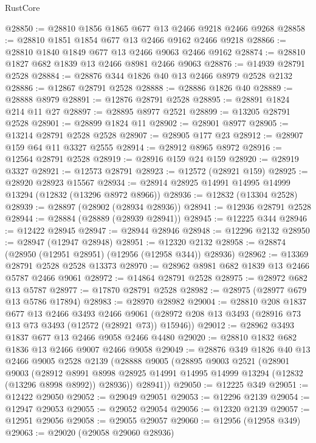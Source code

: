 \begin{lexlean}{RustCore}
\begin{coremodule}
@28850 := @28810 @1856 @1865 @677 @13 @2466 @9218 @2466 @9268
@28858 := @28810 @1851 @1854 @677 @13 @2466 @9162 @2466 @9218
@28866 := @28810 @1840 @1849 @677 @13 @2466 @9063 @2466 @9162
@28874 := @28810 @1827 @682 @1839 @13 @2466 @8981 @2466 @9063
@28876 := @14939 @28791 @2528
@28884 := @28876 @344 @1826 @40 @13 @2466 @8979 @2528 @2132
@28886 := @12867 @28791 @2528
@28888 := @28886 @1826 @40
@28889 := @28888 @8979
@28891 := @12876 @28791 @2528
@28895 := @28891 @1824 @214 @11 @27
@28897 := @28895 @8977 @2521
@28899 := @13205 @28791 @2528
@28901 := @28899 @1824 @11
@28902 := @28901 @8977
@28905 := @13214 @28791 @2528 @2528
@28907 := @28905 @177 @23
@28912 := @28907 @159 @64 @11 @3327 @2555
@28914 := @28912 @8965 @8972
@28916 := @12564 @28791 @2528
@28919 := @28916 @159 @24 @159
@28920 := @28919 @3327
@28921 := @12573 @28791
@28923 := @12572 (@28921 @159)
@28925 := @28920 @28923 @15567
@28934 := @28914 @28925 @14991 @14995 @14999 @13294 (@12832 (@13296 @8972 @8966))
@28936 := @12832 (@13304 @2528)
@28939 := @28897 (@28902 (@28934 @28936))
@28941 := @12936 @28791 @2528
@28944 := @28884 (@28889 (@28939 @28941))
@28945 := @12225 @344
@28946 := @12422 @28945
@28947 := @28944 @28946
@28948 := @12296 @2132
@28950 := @28947 (@12947 @28948)
@28951 := @12320 @2132
@28958 := @28874 (@28950 (@12951 @28951) (@12956 (@12958 @344)) @28936)
@28962 := @13369 @28791 @2528 @2528 @13373
@28970 := @28962 @8981 @682 @1839 @13 @2466 @5787 @2466 @9061
@28972 := @14864 @28791 @2528
@28975 := @28972 @682 @13 @5787
@28977 := @17870 @28791 @2528
@28982 := @28975 (@28977 @679 @13 @5786 @17894)
@28983 := @28970 @28982
@29004 := @28810
    @208
    @1837
    @677
    @13
    @2466
    @3493
    @2466
    @9061
    (@28972 @208 @13 @3493 (@28916 @73 @13 @73 @3493 (@12572 (@28921 @73)) @15946))
@29012 := @28962 @3493 @1837 @677 @13 @2466 @9058 @2466 @4480
@29020 := @28810 @1832 @682 @1836 @13 @2466 @9007 @2466 @9058
@29049 := @28876
    @349
    @1826
    @40
    @13
    @2466
    @9005
    @2528
    @2139
    (@28888
      @9005
      (@28895
        @9003
        @2521
        (@28901
          @9003
          (@28912
            @8991
            @8998
            @28925
            @14991
            @14995
            @14999
            @13294
            (@12832 (@13296 @8998 @8992))
            @28936))
        @28941))
@29050 := @12225 @349
@29051 := @12422 @29050
@29052 := @29049 @29051
@29053 := @12296 @2139
@29054 := @12947 @29053
@29055 := @29052 @29054
@29056 := @12320 @2139
@29057 := @12951 @29056
@29058 := @29055 @29057
@29060 := @12956 (@12958 @349)
@29063 := @29020 (@29058 @29060 @28936)

\end{coremodule}
\end{lexlean}
